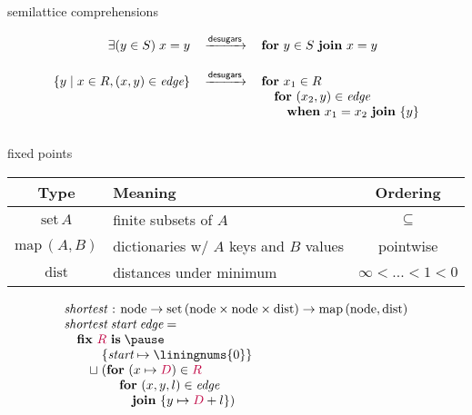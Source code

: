 \documentclass[aspectratio=141,dvipsnames]{beamer}
\newcommand\x\times
\newcommand\isa{\hspace{.1em}:\hspace{.1em}}
\newcommand\desugars{\,\xrightarrow{\textsf{desugars}}\,}
\newcommand{\setfor}[2]{\{{#1} \mathrel{|} {#2}\}}
\newcommand\kw\textbf
\newcommand\n\textit
\newcommand\tpname\text
\newcommand\tset{\tpname{set}\,}
\newcommand\tmap[2]{\tpname{map}\,(#1,#2)}
\newcommand\tnode{\tpname{node}}
\newcommand\mvar[1]{{\mvarcolor #1}}
\newcommand\mvarcolor{\color{purple}}
\newcommand\eforloop[1]{\kw{for}\hspace{.33em} {#1} \hspace{.33em}}
\newcommand\eforjoin{\kw{join}\hspace{.33em}}
\newcommand\eforwhen[1]{\kw{when}\hspace{.33em} {#1} \hspace{.33em}}
\newcommand\efor[1]{\eforloop{#1} \eforjoin}
\newcommand\eforvar[2]{\efor{{#1} \in {#2}}}
\newcommand\efixis[1]{\kw{fix}~{#1}~\kw{is}\;}
\newcommand\eset[1]{\{{#1}\}}
\let\oldsqcup\sqcup
\renewcommand\sqcup{\mathrel{\oldsqcup}}
\begin{document}
  \begin{frame}{semilattice comprehensions}

    \begin{fleqn}
      \[
      \begin{array}{rcl}
        \exists (y \in S)\; x = y
        &\desugars&
        \eforvar{y}{S} x = y
        \\[3ex]
        \setfor{y}{x \in R, (x,y) \in \n{edge}}
        &\desugars&
        \eforloop{x_1 \in R}
        \\
        &&\quad \eforloop{(x_2,y) \in \n{edge}}
        \\
        &&\qquad
        \eforwhen{x_1 = x_2} \eforjoin \eset{y}
        \\[2ex]
      \end{array}
      \]
    \end{fleqn}


  \end{frame}


  \newcommand\tdist{\tpname{dist}}
  
  \begin{frame}{fixed points}
    \setlength\tabcolsep{1em}
    \large
    \begin{tabular}{@{}clc@{}}
      \textbf{Type} & \textbf{Meaning} & \textbf{Ordering} %
      \\\midrule
      $\tset A$      & finite subsets of $A$ & ${\subseteq}$ %
      \\
      $\tmap A B$ & dictionaries w/ $A$ keys and $B$ values
      & pointwise
      \\
      $\tdist$ & distances under minimum
      & $\infty < ... < 1 < 0$
    \end{tabular}

    \vspace{\baselineskip}
    \begin{fleqn}
      \[\begin{array}{l}
      \n{shortest} \isa \tnode \to \tset{(\tnode \x \tnode \x \tpname{dist})}
      \to \tmap{\tnode}{\tpname{dist}}
      \\
      \n{shortest} \;\n{start} \;\n{edge} =
      \\\quad
      \efixis{\mvar R} \pause
      \\\qquad
      \phantom{\sqcup{}}
      \eset{\n{start} \mapsto \text{\liningnums{0}}}
      \\
      \qquad \sqcup
      (\eforloop{(x \mapsto \mvar{D}) \in \mvar R}\\
      \qquad\phantom{\sqcup (} \quad \eforloop{(x,y,l) \in \n{edge}}\\
      \qquad\phantom{\sqcup (} \qquad \eforjoin \eset{y \mapsto \mvar{D} + l})
      \end{array}
      \]
    \end{fleqn}

  \end{frame}
\end{document}
